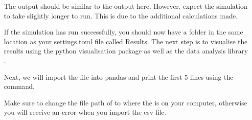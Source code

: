 \documentclass[letterpaper,10pt,english]{sphinxmanual}
\begin{document}
The output should be similar to the output here. However, expect the simulation to take slightly longer to run. This is due to the additional calculations made.

If the simulation has run successfully, you should now have a folder in the same location as your settings.toml file called Results. The next step is to visualise the results using the python visualisation package  as well as the data analysis library .

{
\begin{sphinxVerbatim}[commandchars=\\\{\}]
\llap{\color{nbsphinxin}[2]:\,\hspace{\fboxrule}\hspace{\fboxsep}}   
   
\end{sphinxVerbatim}
}

Next, we will import the  file into pandas and print the first 5 lines using the  command.

Make sure to change the file path of  to where the  is on your computer, otherwise you will receive an error when you import the csv file.

{
\begin{sphinxVerbatim}[commandchars=\\\{\}]
\llap{\color{nbsphinxin}[6]:\,\hspace{\fboxrule}\hspace{\fboxsep}}  
\end{sphinxVerbatim}
}
\end{document}
